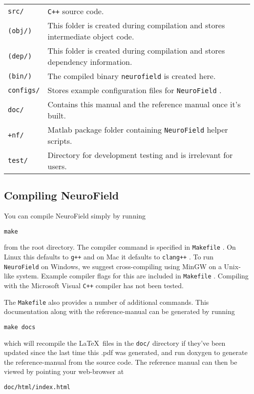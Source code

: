 \documentclass[12pt,a4paper]{article}
\newcommand{\type}[1]{{\small\small\tt #1} }
\newcommand{\NF}[0]{\type{NeuroField}}
\begin{document}
\begin{tabular}{l p{13cm}}
\type{src/}& \type{C++} source code.\\
\type{(obj/)}& This folder is created during compilation and stores intermediate object code.\\
\type{(dep/)}& This folder is created during compilation and stores dependency information.\\
\type{(bin/)}& The compiled binary \type{neurofield} is created here.\\
\type{configs/}& Stores example configuration files for \NF.\\
\type{doc/}& Contains this manual and the reference manual once it's built.\\
\type{+nf/}& Matlab package folder containing \NF helper scripts.\\
\type{test/}& Directory for development testing and is irrelevant for users.\\
\end{tabular}

\subsection{Compiling NeuroField}
\label{sec:compiling}
You can compile NeuroField simply by running

\begin{lstlisting}
make
\end{lstlisting}

from the root directory. The compiler command is specified in \type{Makefile}. On Linux this defaults to \type{g++} and on Mac it defaults to \type{clang++}. To run \NF on Windows, we suggest cross-compiling using MinGW on a Unix-like system. Example compiler flags for this are included in \type{Makefile}. Compiling with the Microsoft Visual \type{C++} compiler has not been tested.

The \type{Makefile} also provides a number of additional commands. This documentation along with the reference-manual can be generated by running
\begin{lstlisting}
make docs
\end{lstlisting}
which will recompile the \LaTeX\ files in the \type{doc/} directory if they've been updated since the last time this .pdf was generated, and run doxygen to generate the reference-manual from the source code. The reference manual can then be viewed by pointing your web-browser at

\begin{lstlisting}
doc/html/index.html
\end{lstlisting}
\end{document}
